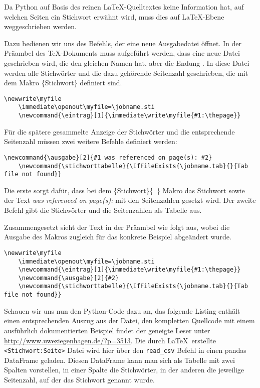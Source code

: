 \documentclass[ngerman]{dtk}
\newcommand{\eintrag}[1]{\immediate\write\myfile{#1:\thepage}}
\newcommand{\ausgabe}[2]{#2}
\newcommand{\stichworttabelle}{\IfFileExists{\jobname.tab}{}{Tab file not found}}
\begin{document}
Da Python auf Basis des reinen \LaTeX-Quelltextes keine Information hat, auf welchen Seiten ein Stichwort erwähnt wird, 
muss dies auf \LaTeX -Ebene weggeschrieben werden. 

Dazu bedienen wir uns des  Befehls, der eine neue Ausgabedatei öffnet.  In der Präambel des \TeX-Dokuments muss aufgeführt werden, dass eine neue Datei geschrieben wird, die den gleichen Namen hat, aber die Endung . In diese Datei werden alle Stichwörter und die dazu gehörende Seitenzahl geschrieben, 
die mit dem Makro \{Stichwort\}  definiert sind.
\begin{lstlisting}[style=nonumber]
	\newwrite\myfile
	\immediate\openout\myfile=\jobname.sti
	\newcommand{\eintrag}[1]{\immediate\write\myfile{#1:\thepage}}
\end{lstlisting}
Für die spätere gesammelte Anzeige der Stichwörter und die entsprechende Seitenzahl müssen zwei weitere Befehle definiert 
werden:

\begin{lstlisting}[style=nonumber]
	\newcommand{\ausgabe}[2]{#1 was referenced on page(s): #2}
	\newcommand{\stichworttabelle}{\IfFileExists{\jobname.tab}{}{Tab file not found}}
\end{lstlisting}

Die erste sorgt dafür, dass bei dem  \{Stichwort\}\{~\}  Makro das Stichwort sowie der Text 
\emph{was referenced on page(s):} mit den Seitenzahlen gesetzt wird. Der zweite Befehl gibt die Stichwörter und die Seitenzahlen als Tabelle aus.

Zusammengesetzt sieht der Text in der Präambel wie folgt aus,
wobei die Ausgabe des  Makros zugleich für das konkrete Beispiel abgeändert wurde.
\begin{lstlisting}[style=number]
	\newwrite\myfile
	\immediate\openout\myfile=\jobname.sti
	\newcommand{\eintrag}[1]{\immediate\write\myfile{#1:\thepage}}
	\newcommand{\ausgabe}[2]{#2}
	\newcommand{\stichworttabelle}{\IfFileExists{\jobname.tab}{}{Tab file not found}}
\end{lstlisting}
Schauen wir uns nun den Python-Code dazu an, das folgende Listing enthält einen entsprechenden Auszug aus der Datei, den kompletten Quellcode mit einem ausführlich dokumentierten Beispiel findet der geneigte Leser unter \url{http://www.uweziegenhagen.de/?p=3513}. Die durch \LaTeX\ erstellte \texttt{<Stichwort:Seite>} Datei wird hier über den \verb|read_csv| Befehl in einen pandas DataFrame geladen. Diesen DataFrame kann man sich als Tabelle mit zwei Spalten vorstellen, in einer Spalte die Stichwörter, in der anderen die jeweilige Seitenzahl, auf der das Stichwort genannt wurde. 
\end{document}
